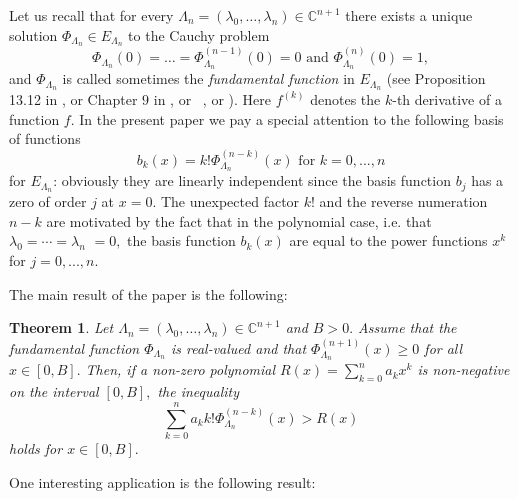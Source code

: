 \documentclass[11pt]{article}%
\newtheorem{theorem}{Theorem}
\begin{document}
Let us recall that for every $\Lambda_{n}=\left(  \lambda_{0},\ldots
,\lambda_{n}\right)  \in\mathbb{C}^{n+1}$ there exists a unique solution
$\Phi_{\Lambda_{n}}\in E_{\Lambda_{n}}$ to the Cauchy problem
\[
\Phi_{\Lambda_{n}}\left(  0\right)  =\ldots=\Phi_{\Lambda_{n}}^{\left(
n-1\right)  }\left(  0\right)  =0\text{ and }\Phi_{\Lambda_{n}}^{\left(
n\right)  }\left(  0\right)  =1,
\]
and $\Phi_{\Lambda_{n}}$ is called sometimes the \emph{fundamental function}
in $E_{\Lambda_{n}}$ (see Proposition 13.12 in \cite{okbook}, or Chapter $9$
in \cite{Sc81}, or \ \cite{micchelli}, or \cite[p. 501]{Karl68}). Here
$f^{\left(  k\right)  }$ denotes the $k$-th derivative of a function $f.$ In
the present paper we pay a special attention to the following basis of
functions
\[
b_{k}\left(  x\right)  =k!\Phi_{\Lambda_{n}}^{\left(  n-k\right)  }\left(
x\right)  \text{ for }k=0,...,n
\]
for $E_{\Lambda_{n}}$: obviously they are linearly independent since the basis
function $b_{j}$ has a zero of order $j$ at $x=0.$ The unexpected factor $k!$
and the reverse numeration $n-k$ are motivated by the fact that in the
polynomial case, i.e. that $\lambda_{0}=\cdots=\lambda_{n}$ $=0,$ the basis
function $b_{k}\left(  x\right)  $ are equal to the power functions $x^{k}$
for $j=0,...,n$.

The main result of the paper is the following:

\begin{theorem}
\label{ThmMain1}Let $\Lambda_{n}=\left(  \lambda_{0},\ldots,\lambda
_{n}\right)  \in\mathbb{C}^{n+1}$ and $B>0.$ Assume that the fundamental
function $\Phi_{\Lambda_{n}}$ is real-valued and that $\Phi_{\Lambda_{n}%
}^{\left(  n+1\right)  }\left(  x\right)  \geq0$ for all $x\in\left[
0,B\right]  .$ Then, if a non-zero polynomial $R\left(  x\right)  =%
{\displaystyle\sum_{k=0}^{n}}
a_{k}x^{k}$ is non-negative on the interval $\left[  0,B\right]  ,$ the
inequality
\[%
{\displaystyle\sum_{k=0}^{n}}
a_{k}k!\Phi_{\Lambda_{n}}^{\left(  n-k\right)  }\left(  x\right)  >R\left(
x\right)
\]
holds for $x\in\left[  0,B\right]  .$
\end{theorem}

One interesting application is the following result:
\end{document}

